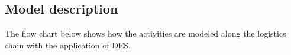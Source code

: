 \subsection{Model description}
The flow chart below shows  how the activities are modeled along the logistics chain with the application of DES.